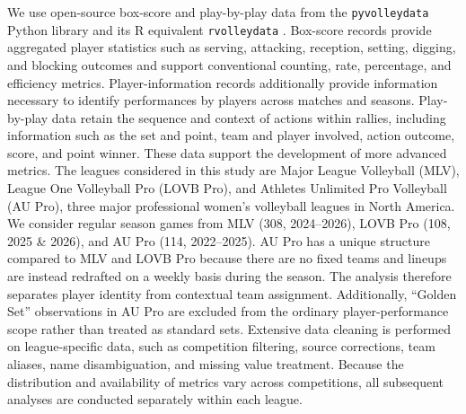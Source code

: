 \documentclass[10pt]{article}
\begin{document}
We use open-source box-score and play-by-play data from the \texttt{pyvolleydata} Python library \citep{awosoga_pyvolleydata_2026} and its R equivalent \texttt{rvolleydata} \citep{awosoga_rvolleydata_2026}.
Box-score records provide aggregated player statistics such as serving, attacking, reception, setting, digging, and blocking outcomes and support conventional counting, rate, percentage, and efficiency metrics.
Player-information records additionally provide information necessary to identify performances by players across matches and seasons.
Play-by-play data retain the sequence and context of actions within rallies, including information such as the set and point, team and player involved, action outcome, score, and point winner.
These data support the development of more advanced metrics.
The leagues considered in this study are Major League Volleyball (MLV), League One Volleyball Pro (LOVB Pro), and Athletes Unlimited Pro Volleyball (AU Pro), three major professional women's volleyball leagues in North America.
We consider regular season games from MLV (308, 2024--2026), LOVB Pro (108, 2025 \& 2026), and AU Pro (114, 2022--2025).
AU Pro has a unique structure compared to MLV and LOVB Pro because there are no fixed teams and lineups are instead redrafted on a weekly basis during the season.
The analysis therefore separates player identity from contextual team assignment.
Additionally, ``Golden Set'' observations in AU Pro are excluded from the ordinary player-performance scope rather than treated as standard sets.
Extensive data cleaning is performed on league-specific data, such as competition filtering, source corrections, team aliases, name disambiguation, and missing value treatment.
Because the distribution and availability of metrics vary across competitions, all subsequent analyses are conducted separately within each league.
\end{document}
